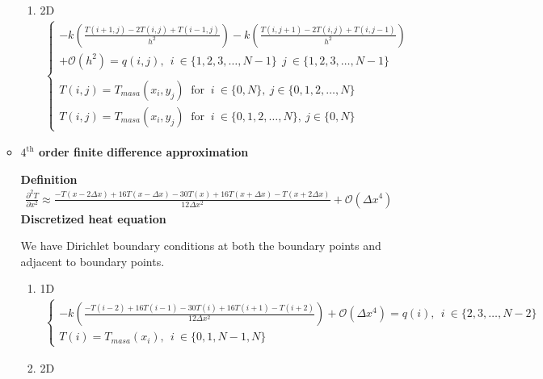 \documentclass[12 pt, final]{article}
\begin{document}
\begin{itemize}
\begin{itemize}
\begin{enumerate}
                \item 2D
                \begin{align}
                \begin{cases}    -k\left(\frac{T(i+1,j)-2T(i,j)+T(i-1,j)}{h^2}\right) -k\left(\frac{T(i,j+1)-2T(i,j)+T(i,j-1)}{h^2}\right) \\
                +\mathcal{O}(h^2)= q(i,j),\:\: i \:\in \{1,2,3,\hdots, N-1\}\:\:j \:\in \{1,2,3,\hdots, N-1\}\\\\
                T(i,j) = T_{masa} (x_i,y_j) \:\text{ for }\: i \:\in \{0,N\},\:j\in\{0, 1, 2, \hdots , N\}\\
                T(i,j) = T_{masa} (x_i,y_j) \:\text{ for }\: i \:\in \{0, 1, 2, \hdots , N\},\:j\in\{0,N\} \label{eq3}
                \end{cases}
                \end{align}
                
            \end{enumerate}
            \item \textbf{$4^{\text{th}}$ order finite difference approximation}
            
            \textbf{Definition}
            \begin{align*}
                \frac{\partial^2 T}{\partial x^2} \approx \frac{-T(x-2\Delta x) + 16 T(x-\Delta x) - 30 T(x) + 16 T(x+\Delta x) - T(x+2\Delta x)}{12 \Delta x^2}+ \mathcal{O}(\Delta x^4)
            \end{align*}            
            \textbf{Discretized heat equation}
            
            We have Dirichlet boundary conditions at both the boundary points and adjacent to boundary points.
            \begin{enumerate}
                \item 1D
                \begin{align}
                \begin{cases}
                    -k\left(\frac{-T(i-2) + 16 T(i-1) - 30 T(i) + 16 T(i+1) - T(i+2)}{12 \Delta x^2}\right)+ \mathcal{O}(\Delta x^4) = q(i), \:\: i \:\in \{2,3,\hdots, N-2\}\\
                    T(i) = T_{masa} (x_i), \:\: i \:\in \{0,1,N-1,N\} \label{eq4}
                \end{cases}
                \end{align}
                \item 2D
                

\end{enumerate}
\end{itemize}
\end{itemize}
\end{document}
